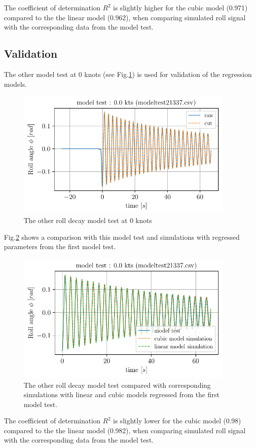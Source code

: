 The coefficient of determination $R^2$ is slightly higher for the
cubic model (0.971) compared to the the linear model (0.962), when
comparing simulated roll signal with the corresponding data from the
model test.
\subsection*{Validation}\label{validation}
The other model test at 0 knots (see
Fig.\ref{fig:other_roll_decay}) is used for validation of the
regression models.
\begin{figure}[H]
\begin{center}\includegraphics[width = 0.95\textwidth]{figures/other_roll_decay.pdf}\end{center}
\vspace{-0.7cm}
\caption{The other roll decay model test at 0 knots}
\label{fig:other_roll_decay}
\end{figure}
Fig.\ref{fig:other_roll_decay_sim} shows a comparison with this
model test and simulations with regressed parameters from the first
model test.
\begin{figure}[H]
\begin{center}\includegraphics[width = 0.95\textwidth]{figures/other_roll_decay_sim.pdf}\end{center}
\vspace{-0.7cm}
\caption{The other roll decay model test compared with corresponding simulations with linear and cubic models regressed from the first model test.}
\label{fig:other_roll_decay_sim}
\end{figure}
The coefficient of determination $R^2$ is slightly lower for the cubic
model (0.98) compared to the the linear model (0.982), when comparing
simulated roll signal with the corresponding data from the model test.
